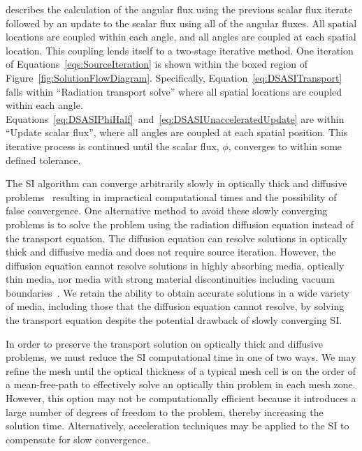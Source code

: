 \documentclass[12pt,letterpaper]{article}
\begin{document}
\noindent describes the calculation of the angular flux using the previous scalar flux iterate followed by an update to the scalar flux using all of the angular fluxes. All spatial locations are coupled within each angle, and all angles are coupled at each spatial location. This coupling lends itself to a two-stage iterative method. One iteration of Equations~\ref{eqs:SourceIteration} is shown within the boxed region of Figure~\ref{fig:SolutionFlowDiagram}. Specifically, Equation~\ref{eq:DSASITransport} falls within ``Radiation transport solve'' where all spatial locations are coupled within each angle. Equations~\ref{eq:DSASIPhiHalf}~and~\ref{eq:DSASIUnacceleratedUpdate} are within ``Update scalar flux'', where all angles are coupled at each spatial position. This iterative process is continued until the scalar flux, $\phi$, converges to within some defined tolerance.

The SI algorithm can converge arbitrarily slowly in optically thick and diffusive problems~\cite{LarsenStableDSATheory} resulting in impractical computational times and the possibility of false convergence. One alternative method to avoid these slowly converging problems is to solve the problem using the radiation diffusion equation instead of the transport equation. The diffusion equation can resolve solutions in optically thick and diffusive media and does not require source iteration. However, the diffusion equation cannot resolve solutions in highly absorbing media, optically thin media, nor media with strong material discontinuities including vacuum boundaries~\cite{D&H}. We retain the ability to obtain accurate solutions in a wide variety of media, including those that the diffusion equation cannot resolve, by solving the transport equation despite the potential drawback of slowly converging SI.

In order to preserve the transport solution on optically thick and diffusive problems, we must reduce the SI computational time in one of two ways. We may refine the mesh until the optical thickness of a typical mesh cell is on the order of a mean-free-path to effectively solve an optically thin problem in each mesh zone. However, this option may not be computationally efficient because it introduces a large number of degrees of freedom to the problem, thereby increasing the solution time. Alternatively, acceleration techniques may be applied to the SI to compensate for slow convergence.
\end{document}
